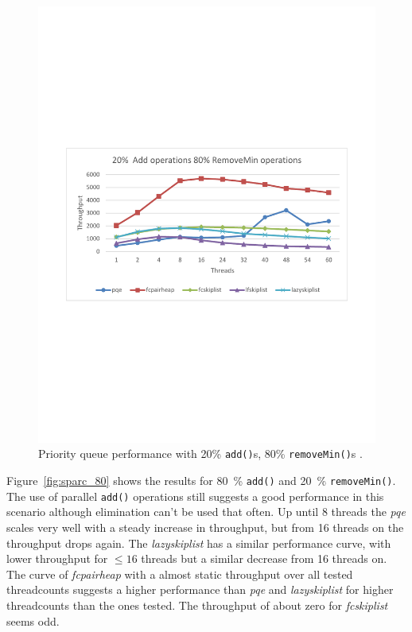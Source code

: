 \begin{figure}[htb]
\begin{minipage}[b]{.495\textwidth}
		\includegraphics[width=\linewidth]{graphics/sparc-20-80.pdf}
		\caption{Priority queue performance with 20\% \texttt{add()}s, 80\% \texttt{removeMin()}s \cite{calciu_adaptive_2014}.}
		\label{fig:sparc_20}
	\end{minipage}
\end{figure}

Figure~\ref{fig:sparc_80} shows the results for 80~\% \texttt{add()} and 20~\% \texttt{removeMin()}. The use of parallel \texttt{add()} operations still suggests a good performance in this scenario although elimination can't be used that often. Up until 8 threads the \textit{pqe} scales very well with a steady increase in throughput, but from 16 threads on the throughput drops again. The \textit{lazyskiplist} has a similar performance curve, with lower throughput for $\le 16$ threads but a similar decrease from 16 threads on. The curve of \textit{fcpairheap} with a almost static throughput over all tested threadcounts suggests a higher performance than \textit{pqe} and \textit{lazyskiplist} for higher threadcounts than the ones tested. The throughput of about zero for \textit{fcskiplist} seems odd.

